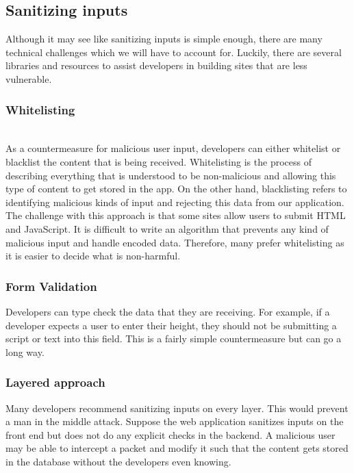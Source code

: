 \documentclass[conference]{IEEEtran}
\begin{document}
\subsection{Sanitizing inputs}

Although it may see like sanitizing inputs is simple enough, there are many technical challenges which we will have to account for. Luckily, there are several libraries and resources to assist developers in building sites that are less vulnerable.\\

\subsubsection{Whitelisting}\\

As a countermeasure for malicious user input, developers can either whitelist or blacklist the content that is being received. Whitelisting is the process of describing everything that is understood to be non-malicious and allowing this type of content to get stored in the app. On the other hand, blacklisting refers to identifying malicious kinds of input and rejecting this data from our application. The challenge with this approach is that some sites allow users to submit HTML and JavaScript. It is difficult to write an algorithm that prevents any kind of malicious input and handle encoded data. Therefore, many prefer whitelisting as it is easier to decide what is non-harmful.\\ 
\subsubsection {Form Validation}
Developers can type check the data that they are receiving. For example, if a developer expects a user to enter their height, they should not be submitting a script or text into this field. This is a fairly simple countermeasure but can go a long way.\\
\subsubsection{Layered approach}
Many developers recommend sanitizing inputs on every layer. This would prevent a man in the middle attack. Suppose the web application sanitizes inputs on the front end but does not do any explicit checks in the backend. A malicious user may be able to intercept a packet and modify it such that the content gets stored in the database without the developers even knowing.\\
\end{document}
